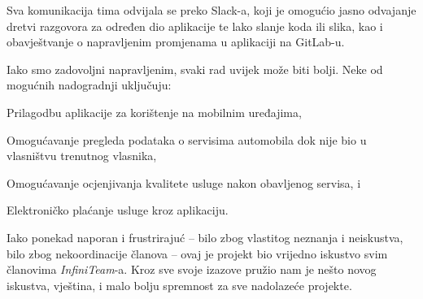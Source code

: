 		 Sva komunikacija tima odvijala se preko Slack-a, koji je omogućio jasno odvajanje dretvi razgovora za određen dio aplikacije te lako slanje koda ili slika, kao i obavještvanje o napravljenim promjenama u aplikaciji na GitLab-u.
		 
		 Iako smo zadovoljni napravljenim, svaki rad uvijek može biti bolji. Neke od mogućnih nadogradnji uključuju:
		 \begin{packed_enum}
		 	\item Prilagodbu aplikacije za korištenje na mobilnim uređajima,
		 	\item Omogućavanje pregleda podataka o servisima automobila dok nije bio u vlasništvu trenutnog vlasnika,
		 	\item Omogućavanje ocjenjivanja kvalitete usluge nakon obavljenog servisa, i
		 	\item Elektroničko plaćanje usluge kroz aplikaciju.
		 \end{packed_enum}
	 
	 	Iako ponekad naporan i frustrirajuć -- bilo zbog vlastitog neznanja i neiskustva, bilo zbog nekoordinacije članova -- ovaj je projekt bio vrijedno iskustvo svim članovima \textit{InfiniTeam}-a. Kroz sve svoje izazove pružio nam je nešto novog iskustva, vještina, i malo bolju spremnost za sve nadolazeće projekte.
		
		\eject 